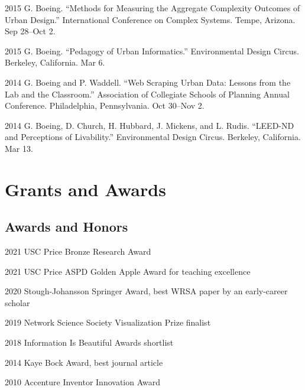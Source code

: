 \documentclass[12pt,letterpaper]{report}
\begin{document}
\begin{tablist}
        \item[2015] \tab{}G. Boeing. \enquote{Methods for Measuring the Aggregate Complexity Outcomes of Urban Design.} International Conference on Complex Systems. Tempe, Arizona. Sep 28--Oct 2.

        \item[2015] \tab{}G. Boeing. \enquote{Pedagogy of Urban Informatics.} Environmental Design Circus. Berkeley, California. Mar 6.

        \item[2014] \tab{}G. Boeing and P. Waddell. \enquote{Web Scraping Urban Data: Lessons from the Lab and the Classroom.} Association of Collegiate Schools of Planning Annual Conference. Philadelphia, Pennsylvania. Oct 30--Nov 2.

        \item[2014] \tab{}G. Boeing, D. Church, H. Hubbard, J. Mickens, and L. Rudis. \enquote{LEED-ND and Perceptions of Livability.} Environmental Design Circus. Berkeley, California. Mar 13.

    \end{tablist}



    \section*{Grants and Awards}

    \subsection*{Awards and Honors}

    \begin{tablist}

        \item[2021] \tab{}USC Price Bronze Research Award
        \item[2021] \tab{}USC Price ASPD Golden Apple Award for teaching excellence
        \item[2020] \tab{}Stough-Johansson Springer Award, best WRSA paper by an early-career scholar
        \item[2019] \tab{}Network Science Society Visualization Prize finalist
        \item[2018] \tab{}Information Is Beautiful Awards shortlist
        \item[2014] \tab{}Kaye Bock Award, best journal article
        \item[2010] \tab{}Accenture Inventor Innovation Award

    \end{tablist}
\end{document}
